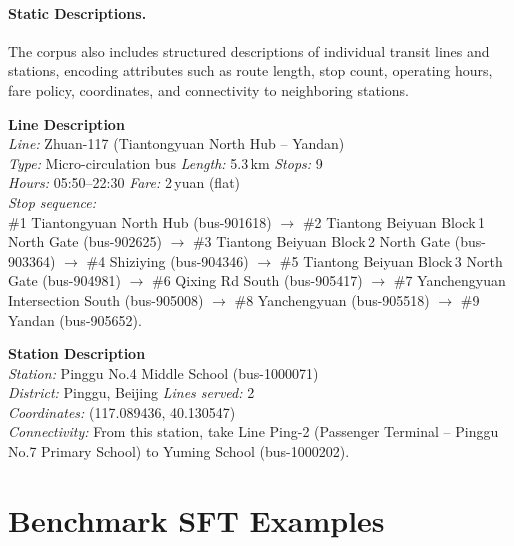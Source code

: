 \documentclass{article}
\begin{document}
\paragraph{Static Descriptions.}
The corpus also includes structured descriptions of individual transit lines and stations, encoding attributes such as route length, stop count, operating hours, fare policy, coordinates, and connectivity to neighboring stations.

\begin{tcolorbox}[colback=gray!3, colframe=black!40, boxrule=0.4pt, arc=2pt, left=6pt, right=6pt, top=4pt, bottom=4pt, fontupper=\small, fontlower=\small, breakable, title={\small\textbf{CPT Static Descriptions}}]
\textbf{Line Description} \\[2pt]
\textit{Line:} Zhuan-117 (Tiantongyuan North Hub -- Yandan) \\
\textit{Type:} Micro-circulation bus \quad \textit{Length:} 5.3\,km \quad \textit{Stops:} 9 \\
\textit{Hours:} 05:50--22:30 \quad \textit{Fare:} 2\,yuan (flat) \\[2pt]
\textit{Stop sequence:} \\
\#1 Tiantongyuan North Hub (bus-901618) $\rightarrow$
\#2 Tiantong Beiyuan Block\,1 North Gate (bus-902625) $\rightarrow$
\#3 Tiantong Beiyuan Block\,2 North Gate (bus-903364) $\rightarrow$
\#4 Shiziying (bus-904346) $\rightarrow$
\#5 Tiantong Beiyuan Block\,3 North Gate (bus-904981) $\rightarrow$
\#6 Qixing Rd South (bus-905417) $\rightarrow$
\#7 Yanchengyuan Intersection South (bus-905008) $\rightarrow$
\#8 Yanchengyuan (bus-905518) $\rightarrow$
\#9 Yandan (bus-905652).

\tcblower

\textbf{Station Description} \\[2pt]
\textit{Station:} Pinggu No.4 Middle School (bus-1000071) \\
\textit{District:} Pinggu, Beijing \quad \textit{Lines served:} 2 \\
\textit{Coordinates:} (117.089436, 40.130547) \\[2pt]
\textit{Connectivity:} From this station, take Line Ping-2 (Passenger Terminal -- Pinggu No.7 Primary School) to Yuming School (bus-1000202).
\end{tcolorbox}

\section{Benchmark SFT Examples}
\label{app:benchmark_examples}
\end{document}
